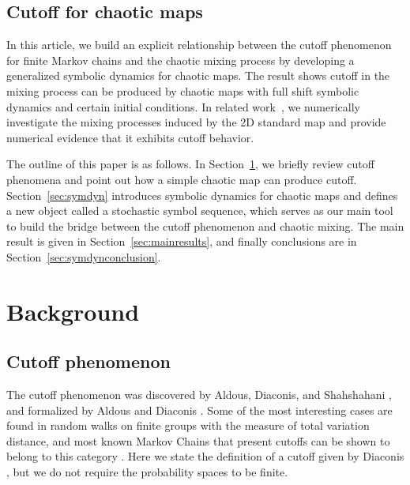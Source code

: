 \documentclass[final]{siamltex}
\begin{document}
\subsection{Cutoff for chaotic maps}
In this article, we build an explicit relationship between the cutoff
phenomenon for finite Markov chains and the chaotic mixing process by
developing a generalized symbolic dynamics for chaotic maps. The
result shows cutoff in the mixing process can be produced by chaotic
maps with full shift symbolic dynamics and certain initial
conditions. In related work~\cite{numcutoff}, we numerically
investigate the mixing processes induced by the 2D standard map and
provide numerical evidence that it exhibits cutoff behavior.

The outline of this paper is as follows. In
Section~\ref{sec:background}, we briefly review cutoff phenomena and
point out how a simple chaotic map can produce
cutoff. Section~\ref{sec:symdyn} introduces symbolic dynamics for
chaotic maps and defines a new object called a stochastic symbol
sequence, which serves as our main tool to build the bridge between
the cutoff phenomenon and chaotic mixing. The main result is given in
Section~\ref{sec:mainresults}, and finally conclusions are in
Section~\ref{sec:symdynconclusion}.

\section{Background}
\label{sec:background}

\subsection{Cutoff phenomenon}
The cutoff phenomenon was discovered by Aldous, Diaconis, and
Shahshahani \cite{Diaconis1987, Diaconis1986, Diaconis1981}, and
formalized by Aldous and Diaconis \cite{Diaconis1996,
  Diaconis1987}. Some of the most interesting cases are found in
random walks on finite groups with the measure of total variation
distance, and most known Markov Chains that present cutoffs can be
shown to belong to this category \cite{LSaloff-Costt2004}. Here we
state the definition of a cutoff given by Diaconis
\cite{Diaconis2005}, but we do not require the probability spaces to
be finite.
\end{document}
